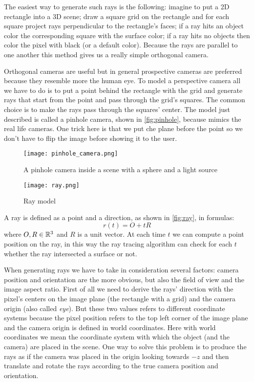 The easiest way to generate such rays is the following:
imagine to put a 2D rectangle into a 3D scene;
draw a square grid on the rectangle and for each square project rays perpendicular to the rectangle's faces;
if a ray hits an object color the corresponding square with the surface color;
if a ray hits no objects then color the pixel with black (or a default color).
Because the rays are parallel to one another this method gives us a really simple orthogonal camera.

Orthogonal cameras are useful but in general prospective cameras are preferred because they resemble more the human eye.
To model a perspective camera all we have to do is to put a point behind the rectangle with the grid and generate rays that start from the point and pass through the grid's squares.
The common choice is to make the rays pass through the squares' center. %
The model just described is called a pinhole camera, shown in \autoref{fig:pinhole}, because mimics the real life cameras.
One trick here is that we put che plane before the point so we don't have to flip the image before showing it to the user.
\begin{figure}[!htb]
  \texttt{[image: pinhole\_camera.png]}
  \caption{A pinhole camera inside a scene with a sphere and a light source}
  \label{fig:pinhole}
\endminipage\hfill
{}
  \texttt{[image: ray.png]}
  \caption{Ray model}
  \label{fig:ray}
\endminipage
\end{figure}

A ray is defined as a point and a direction, as shown in \autoref{fig:ray},
in formulas:
$$
r(t) = O + tR
$$
where $O,R \in \mathbb{R}^3$ and $R$ is a unit vector.
At each time $t$ we can compute a point position on the ray, in this way the ray tracing algorithm can check for each $t$ whether the ray intersected a surface or not.


When generating rays we have to take in consideration several factors:
camera position and orientation are the more obvious, but also the field of view and the image aspect ratio.
First of all we need to derive the rays' direction with the pixel's centers on the image plane (the rectangle with a grid) and the camera origin (also called \emph{eye}).
But these two values refers to different coordinate systems because the pixel position refers to the top left corner of the image plane and the camera origin is defined in world coordinates.
Here with world coordinates we mean the coordinate system with which the object (and the camera) are placed in the scene.
One way to solve this problem is to produce the rays as if the camera was placed in the origin looking towards $-z$ and then translate and rotate the rays according to the true camera position and orientation.


